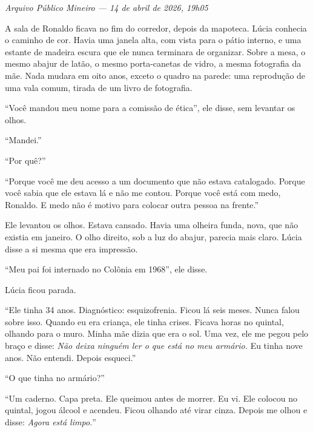 
\noindent \textit{Arquivo Público Mineiro --- 14 de abril de 2026, 19h05}

\noindent A sala de Ronaldo ficava no fim do corredor, depois da mapoteca. Lúcia conhecia o caminho de cor. Havia uma janela alta, com vista para o pátio interno, e uma estante de madeira escura que ele nunca terminara de organizar. Sobre a mesa, o mesmo abajur de latão, o mesmo porta-canetas de vidro, a mesma fotografia da mãe. Nada mudara em oito anos, exceto o quadro na parede: uma reprodução de uma vala comum, tirada de um livro de fotografia.

\noindent ``Você mandou meu nome para a comissão de ética'', ele disse, sem levantar os olhos.

\noindent ``Mandei.''

\noindent ``Por quê?''

\noindent ``Porque você me deu acesso a um documento que não estava catalogado. Porque você sabia que ele estava lá e não me contou. Porque você está com medo, Ronaldo. E medo não é motivo para colocar outra pessoa na frente.''

\noindent Ele levantou os olhos. Estava cansado. Havia uma olheira funda, nova, que não existia em janeiro. O olho direito, sob a luz do abajur, parecia mais claro. Lúcia disse a si mesma que era impressão.

\noindent ``Meu pai foi internado no Colônia em 1968'', ele disse.

\noindent Lúcia ficou parada.

\noindent ``Ele tinha 34 anos. Diagnóstico: esquizofrenia. Ficou lá seis meses. Nunca falou sobre isso. Quando eu era criança, ele tinha crises. Ficava horas no quintal, olhando para o muro. Minha mãe dizia que era o sol. Uma vez, ele me pegou pelo braço e disse: \textit{Não deixa ninguém ler o que está no meu armário.} Eu tinha nove anos. Não entendi. Depois esqueci.''

\noindent ``O que tinha no armário?''

\noindent ``Um caderno. Capa preta. Ele queimou antes de morrer. Eu vi. Ele colocou no quintal, jogou álcool e acendeu. Ficou olhando até virar cinza. Depois me olhou e disse: \textit{Agora está limpo.}''

